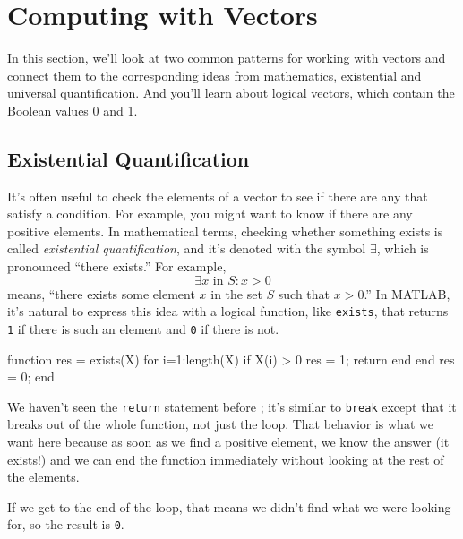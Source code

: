 \documentclass[../../book.tex]{subfiles}
\begin{document}
\section{Computing with Vectors}

In this section, we'll look at two common patterns for working with vectors and connect them to the corresponding ideas from mathematics, existential and universal quantification.  And you'll learn about logical vectors, which contain the Boolean values 0 and 1.

\subsection{Existential Quantification}


It's often useful to check the elements of a vector to see if there
are any that satisfy a condition.  For example, you might want to
know if there are any positive elements.  In mathematical terms, checking whether something exists is called \emph{existential quantification}, and it's denoted with
the symbol $\exists$, which is pronounced ``there exists.''  For example,
%
\[ \exists x \mbox{~in~} S: x>0  \]
%
means, ``there exists some element $x$ in the set $S$ such that
$x>0$.''  In MATLAB, it's natural to express this idea with a logical
function, like \lstinline{exists}, that returns \lstinline{1} if there is such an
element and \lstinline{0} if there is not.

\begin{code}
function res = exists(X)
    for i=1:length(X)
        if X(i) > 0
            res = 1;
            return
        end
    end
    res = 0;
end
\end{code}

We haven't seen the \lstinline{return} statement before ; it's similar
to \lstinline{break} except that it breaks out of the whole function, not
just the loop.  That behavior is what we want here because as soon
as we find a positive element, we know the answer (it exists!) and
we can end the function immediately without looking at the rest
of the elements.


If we get to the end of the loop, that means we didn't find what
we were looking for, so the result is \lstinline{0}.
\end{document}
